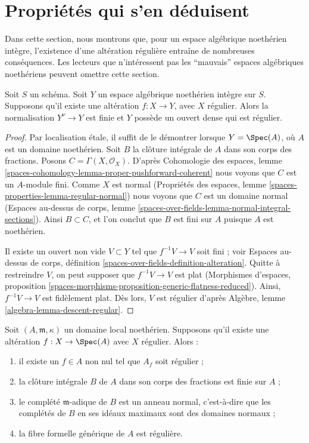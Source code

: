 \section{Propriétés qui s'en déduisent}
\label{section-existence-gives}

\noindent
Dans cette section, nous montrons que, pour un espace algébrique noethérien
intègre, l'existence d'une altération régulière entraîne de nombreuses
conséquences. Les lecteurs que n'intéressent pas les ``mauvais'' espaces
algébriques noethériens peuvent omettre cette section.

\begin{lemma}
\label{lemma-regular-alteration-implies}
Soit $S$ un schéma. Soit $Y$ un espace algébrique noethérien intègre sur $S$.
Supposons qu'il existe une altération $f : X \to Y$, avec $X$ régulier.
Alors la normalisation $Y^\nu \to Y$ est finie et $Y$ possède un ouvert dense
qui est régulier.
\end{lemma}

\begin{proof}
Par localisation étale, il suffit de le démontrer lorsque
$Y = \Spec(A)$, où $A$ est un domaine noethérien.
Soit $B$ la clôture intégrale de $A$ dans son corps des fractions.
Posons $C = \Gamma(X, \mathcal{O}_X)$. D'après
Cohomologie des espaces, lemme
\ref{spaces-cohomology-lemma-proper-pushforward-coherent}
nous voyons que $C$ est un $A$-module fini.
Comme $X$ est normal (Propriétés des espaces, lemme
\ref{spaces-properties-lemma-regular-normal})
nous voyons que $C$ est un domaine normal (Espaces au-dessus de corps, lemme
\ref{spaces-over-fields-lemma-normal-integral-sections}).
Ainsi $B \subset C$, et l'on conclut que $B$ est fini sur $A$ puisque $A$ est
noethérien.

\medskip\noindent
Il existe un ouvert non vide $V \subset Y$ tel que $f^{-1}V \to V$ soit fini ;
voir Espaces au-dessus de corps, définition
\ref{spaces-over-fields-definition-alteration}.
Quitte à restreindre $V$, on peut supposer que $f^{-1}V \to V$ est plat
(Morphismes d'espaces, proposition
\ref{spaces-morphisms-proposition-generic-flatness-reduced}).
Ainsi, $f^{-1}V \to V$ est fidèlement plat. Dès lors, $V$ est régulier d'après
Algèbre, lemme \ref{algebra-lemma-descent-regular}.
\end{proof}

\begin{lemma}
\label{lemma-regular-alteration-implies-local}
Soit $(A, \mathfrak m, \kappa)$ un domaine local noethérien.
Supposons qu'il existe une altération $f : X \to \Spec(A)$ avec $X$ régulier.
Alors :
\begin{enumerate}
\item il existe un $f \in A$ non nul tel que $A_f$ soit régulier ;
\item la clôture intégrale $B$ de $A$ dans son corps des fractions est finie
sur $A$ ;
\item le complété $\mathfrak m$-adique de $B$ est un anneau normal, c'est-à-dire
que les complétés de $B$ en ses idéaux maximaux sont des domaines normaux ;
\item la fibre formelle générique de $A$ est régulière.
\end{enumerate}
\end{lemma}

